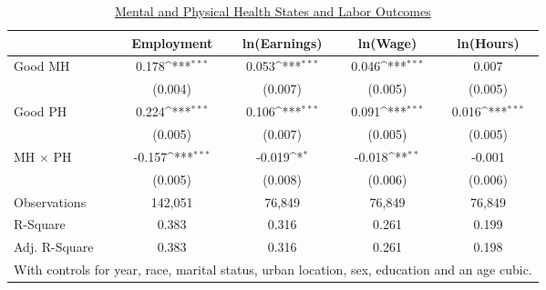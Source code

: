 \documentclass[border=3mm,preview]{standalone}
\begin{document}
\begin{landscape}
\def\sym#1{\ifmmode^{#1}\else\(^{#1}\)\fi}
\begin{table}
\center\caption*{\large{\underline{Mental and Physical Health States and Labor Outcomes}}}
\vspace{0.2cm}
\begin{tabular}{l*{4}{c}}
                    &\multicolumn{1}{c}{Employment}&\multicolumn{1}{c}{ln(Earnings)}&\multicolumn{1}{c}{ln(Wage)}&\multicolumn{1}{c}{ln(Hours)}\\
\midrule
Good MH             &       0.178\sym{***}&       0.053\sym{***}&       0.046\sym{***}&       0.007         \\
                    &     (0.004)         &     (0.007)         &     (0.005)         &     (0.005)         \\
Good PH             &       0.224\sym{***}&       0.106\sym{***}&       0.091\sym{***}&       0.016\sym{***}\\
                    &     (0.005)         &     (0.007)         &     (0.005)         &     (0.005)         \\
MH $\times$ PH      &      -0.157\sym{***}&      -0.019\sym{*}  &      -0.018\sym{**} &      -0.001         \\
                    &     (0.005)         &     (0.008)         &     (0.006)         &     (0.006)         \\
\midrule
Observations        &      142,051         &       76,849         &       76,849         &       76,849         \\
R-Square            &       0.383         &       0.316         &       0.261         &       0.199         \\
Adj. R-Square       &       0.383         &       0.316         &       0.261         &       0.198         \\
\bottomrule
\multicolumn{5}{l}{\scriptsize{With controls for year, race, marital status, urban location, sex, education and an age cubic.}} \\
\end{tabular}
\end{table}
\end{landscape}
\end{document}
